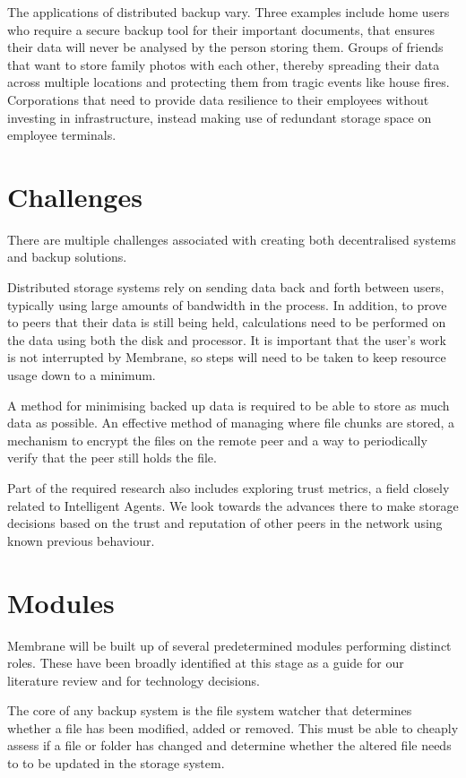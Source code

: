 \documentclass[11pt, a4paper, twoside]{report}
\begin{document}
The applications of distributed backup vary. Three examples include home users who require a secure backup tool for their important documents, that ensures their data will never be analysed by the person storing them. Groups of friends that want to store family photos with each other, thereby spreading their data across multiple locations and protecting them from tragic events like house fires. Corporations that need to provide data resilience to their employees without investing in infrastructure, instead making use of redundant storage space on employee terminals.

\section{Challenges}
There are multiple challenges associated with creating both decentralised systems and backup solutions.

Distributed storage systems rely on sending data back and forth between users, typically using large amounts of bandwidth in the process. In addition, to prove to peers that their data is still being held, calculations need to be performed on the data using both the disk and processor. It is important that the user's work is not interrupted by Membrane, so steps will need to be taken to keep resource usage down to a minimum.

A method for minimising backed up data is required to be able to store as much data as possible. An effective method of managing where file chunks are stored, a mechanism to encrypt the files on the remote peer and a way to periodically verify that the peer still holds the file.

Part of the required research also includes exploring trust metrics, a field closely related to Intelligent Agents. We look towards the advances there to make storage decisions based on the trust and reputation of other peers in the network using known previous behaviour.

\section{Modules}

Membrane will be built up of several predetermined modules performing distinct roles. These have been broadly identified at this stage as a guide for our literature review and for technology decisions.

The core of any backup system is the file system watcher that determines whether a file has been modified, added or removed. This must be able to cheaply assess if a file or folder has changed and determine whether the altered file needs to to be updated in the storage system.
\end{document}

